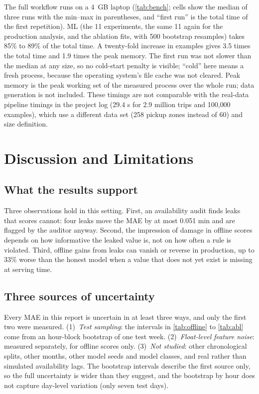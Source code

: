 \documentclass[11pt,a4paper]{article}
\begin{document}
The full workflow runs on a 4~GB laptop (\autoref{tab:bench}; cells show the median of three runs with the min--max in parentheses, and ``first run'' is the total time of the first repetition). ML (the 11 experiments, the same 11 again for the production analysis, and the ablation fits, with 500 bootstrap resamples) takes 85\% to 89\% of the total time. A twenty-fold increase in examples gives 3.5 times the total time and 1.9 times the peak memory. The first run was not slower than the median at any size, so no cold-start penalty is visible; ``cold'' here means a fresh process, because the operating system's file cache was not cleared. Peak memory is the peak working set of the measured process over the whole run; data generation is not included. These timings are not comparable with the real-data pipeline timings in the project log (29.4 s for 2.9 million trips and 100{,}000 examples), which use a different data set (258 pickup zones instead of 60) and size definition.

\section{Discussion and Limitations}\label{sec:limits}
\subsection{What the results support}
Three observations hold in this setting. First, an availability audit finds leaks that scores cannot: four leaks move the MAE by at most 0.051 min and are flagged by the auditor anyway. Second, the impression of damage in offline scores depends on how informative the leaked value is, not on how often a rule is violated. Third, offline gains from leaks can vanish or reverse in production, up to 33\% worse than the honest model when a value that does not yet exist is missing at serving time.

\subsection{Three sources of uncertainty}
Every MAE in this report is uncertain in at least three ways, and only the first two were measured. (1)~\emph{Test sampling}: the intervals in \autoref{tab:offline} to \autoref{tab:abl} come from an hour-block bootstrap of one test week. (2)~\emph{Float-level feature noise}: measured separately, for offline scores only. (3)~\emph{Not studied}: other chronological splits, other months, other model seeds and model classes, and real rather than simulated availability lags. The bootstrap intervals describe the first source only, so the full uncertainty is wider than they suggest, and the bootstrap by hour does not capture day-level variation (only seven test days).
\end{document}
